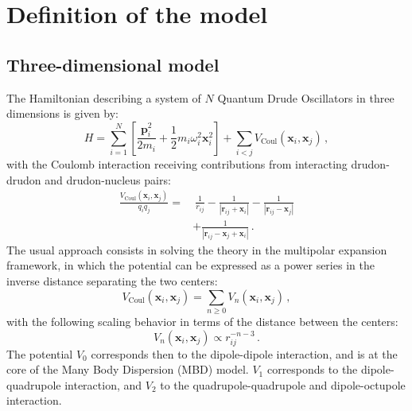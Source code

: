 \documentclass[reprint, amsmath, amssymb, aps]{revtex4-2}
\begin{document}
\section{Definition of the model}

    \subsection{Three-dimensional model}

        The Hamiltonian describing a system of $N$ Quantum Drude Oscillators in three dimensions is given by:
        \begin{equation}
        \label{eq:full_QDO_Hamiltonian}
            H=\sum_{i=1}^N\left[\frac{\bm{p} _i^2}{2m_i} + \frac{1}{2}m_i\omega_i^2\bm{x} _i^2\right] +\sum_{i<j}V_\text{Coul}\left(\bm{x} _i, \bm{x} _j\right)\,,
        \end{equation}
        with the Coulomb interaction receiving contributions from interacting drudon-drudon and drudon-nucleus pairs:
        \begin{equation}
        \label{eq:full_coulomb_potential}
        \begin{split}
            \frac{V_\text{Coul}\left(\bm{x} _i, \bm{x} _j\right)}{q_iq_j}=&\ \frac{1}{r_{ij}} - \frac{1}{|\bm{r}_{ij}
            + \bm{x} _i|} - \frac{1}{|\bm{r}_{ij}  - \bm{x} _j|} \\
            & + \frac{1}{|\bm{r}_{ij} - \bm{x} _j + \bm{x} _i|}\,.
        \end{split}
        \end{equation}
        The usual approach consists in solving the theory in the multipolar expansion framework, in which the potential can be expressed as a power series in the inverse distance separating the two centers:
        \begin{equation}
            V_\text{Coul}\left(\bm{x} _i, \bm{x} _j\right)= \sum_{n\geq 0} V_n\left(\bm{x} _i, \bm{x} _j\right)\,,
        \end{equation}
        with the following scaling behavior in terms of the distance between the centers:
        \begin{equation}
            V_n\left(\bm{x} _i, \bm{x} _j\right)\propto r_{ij}^{-n-3}\,.
        \end{equation}
        The potential $V_0$ corresponds then to the dipole-dipole interaction, and is at the core of the Many Body Dispersion (MBD) model. $V_1$ corresponds to the dipole-quadrupole interaction, and $V_2$ to the quadrupole-quadrupole and dipole-octupole interaction.
\end{document}
